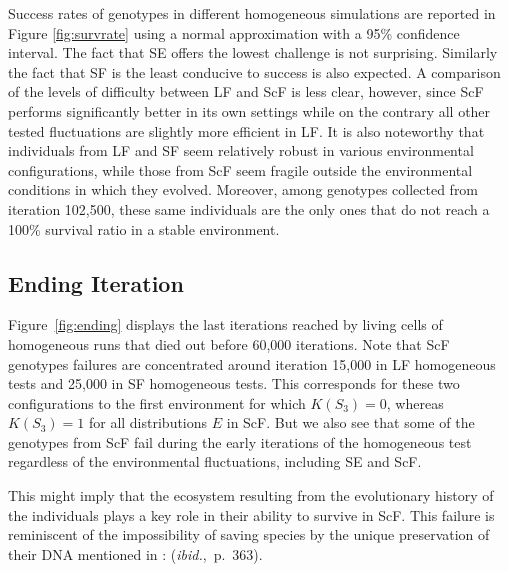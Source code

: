 Success rates of genotypes in different homogeneous simulations are reported in Figure \ref{fig:survrate} using a normal approximation with a 95\% confidence interval. The fact that SE offers the lowest challenge is not surprising. Similarly the fact that SF is the least conducive to success is also expected. A comparison of the levels of difficulty between LF and ScF is less clear, however, since ScF performs significantly better in its own settings while on the contrary all other tested fluctuations are slightly more efficient in LF. It is also noteworthy that individuals from LF and SF seem relatively robust in various environmental configurations, while those from ScF seem fragile outside the environmental conditions in which they evolved. Moreover, among genotypes collected from iteration 102,500, these same individuals are the only ones that do not reach a 100\% survival ratio in a stable environment.

\subsection{Ending Iteration}

Figure~\ref{fig:ending} displays the last iterations reached by living cells of homogeneous runs that died out before 60,000 iterations. Note that ScF genotypes failures are concentrated around iteration 15,000 in LF homogeneous tests and 25,000 in SF homogeneous tests. This corresponds for these two configurations to the first environment for which $K(S_3) = 0$, whereas $K(S_3) = 1$ for all distributions $E$ in ScF. But we also see that some of the genotypes from ScF fail during the early iterations of the homogeneous test regardless of the environmental fluctuations, including SE and ScF.

This might imply that the ecosystem resulting from the evolutionary history of the individuals plays a key role in their ability to survive in ScF. This failure is reminiscent of the impossibility of saving species by the unique preservation of their DNA mentioned in \cite{jablonka2014evolution}:  (\emph{ibid.},~p.~363).

